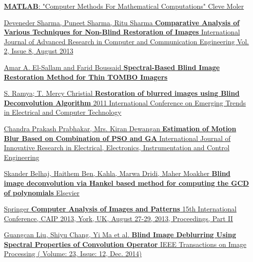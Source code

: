 \documentclass{article}
\begin{document}
\begin{thebibliography}{9}
\href{https://ci.nii.ac.jp/naid/10003556726/}{\textbf{MATLAB}: "Computer Methods For Mathematical Computations" Cleve Moler}

\href{}{Deveneder Sharma, Puneet Sharma, Ritu Sharma \textbf{Comparative Analysis of Various Techniques for Non-Blind Restoration of Images} International Journal of Advanced Research in Computer and Communication Engineering Vol. 2, Issue 8, August 2013}

\href{mdpi.com/1424-8220/8/9/6108/html}{Amar A. El-Sallam and Farid Boussaid \textbf{Spectral-Based Blind Image Restoration Method for Thin TOMBO Imagers}}

\href{https://ieeexplore.ieee.org/document/5760166}{S. Ramya; T. Mercy Christial \textbf{Restoration of blurred images using Blind Deconvolution Algorithm}  2011 International Conference on Emerging Trends in Electrical and Computer Technology}

\href{https://www.ijireeice.com/upload/2016/december-16/IJIREEICE\%2011.pdf}{Chandra Prakash Prabhakar, Mrs. Kiran Dewangan \textbf{Estimation of Motion Blur Based on
Combination of PSO and GA} International Journal of Innovative Research in
Electrical, Electronics, Instrumentation and Control Engineering}

\href{https://www.sciencedirect.com/science/article/abs/pii/S0378475417302793?via\%3Dihub}{Skander Belhaj, Haithem Ben, Kahla, Marwa Dridi, Maher Moakher \textbf{Blind image deconvolution via Hankel based method for computing the GCD of polynomials} Elsevier}

\href{https://link.springer.com/book/10.1007\%2F978-3-642-40246-3}{Springer \textbf{Computer Analysis of Images and Patterns} 15th International Conference, CAIP 2013, York, UK, August 27-29, 2013, Proceedings, Part II}

\href{https://ieeexplore.ieee.org/document/6918507}{Guangcan Liu, Shiyu Chang, Yi Ma et al. \textbf{Blind Image Deblurring Using Spectral Properties of Convolution Operator} IEEE Transactions on Image Processing ( Volume: 23, Issue: 12, Dec. 2014)}

\end{thebibliography}
\end{document}
